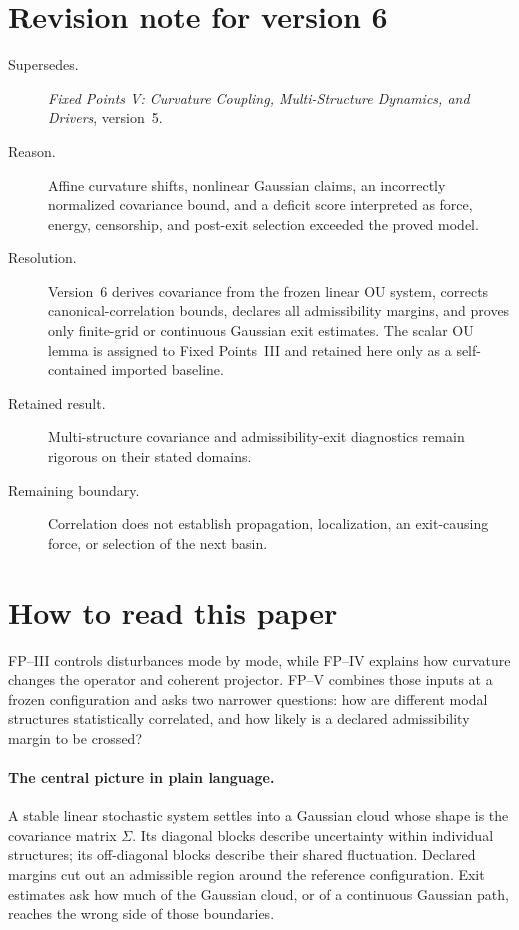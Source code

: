\documentclass[11pt]{article}
\begin{document}
\section*{Revision note for version 6}
\begin{description}
\item[Supersedes.] \emph{Fixed Points V: Curvature Coupling,
Multi-Structure Dynamics, and Drivers}, version~5.
\item[Reason.] Affine curvature shifts, nonlinear Gaussian claims, an
incorrectly normalized covariance bound, and a deficit score interpreted as
force, energy, censorship, and post-exit selection exceeded the proved model.
\item[Resolution.] Version~6 derives covariance from the frozen linear OU
system, corrects canonical-correlation bounds, declares all admissibility
margins, and proves only finite-grid or continuous Gaussian exit estimates.
The scalar OU lemma is assigned to Fixed Points~III and retained here only as
a self-contained imported baseline.
\item[Retained result.] Multi-structure covariance and admissibility-exit
diagnostics remain rigorous on their stated domains.
\item[Remaining boundary.] Correlation does not establish propagation,
localization, an exit-causing force, or selection of the next basin.
\end{description}

\section*{How to read this paper}
FP--III controls disturbances mode by mode, while FP--IV explains how
curvature changes the operator and coherent projector.  FP--V combines those
inputs at a frozen configuration and asks two narrower questions: how are
different modal structures statistically correlated, and how likely is a
declared admissibility margin to be crossed?

\paragraph{The central picture in plain language.}
A stable linear stochastic system settles into a Gaussian cloud whose shape is
the covariance matrix $\Sigma$.  Its diagonal blocks describe uncertainty
within individual structures; its off-diagonal blocks describe their shared
fluctuation.  Declared margins cut out an admissible region around the
reference configuration.  Exit estimates ask how much of the Gaussian cloud,
or of a continuous Gaussian path, reaches the wrong side of those boundaries.
\end{document}
